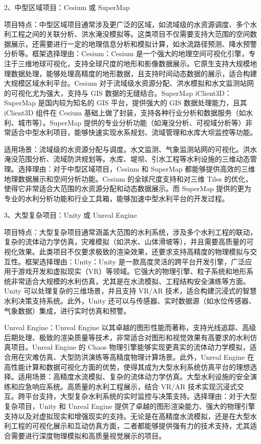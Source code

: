 2、中型区域项目：Cesium 或 SuperMap

项目特点：中型区域项目通常涉及更广泛的区域，如流域级的水资源调度、多个水利工程之间的关联分析、洪水淹没模拟等。这类项目不仅需要支持大范围的空间数据展示，还需要进行一定的地理信息分析和模拟计算，如水流路径预测、降水预警分析等。框架选择理由：Cesium：Cesium 是一个强大的地理空间可视化引擎，专注于三维地球可视化，支持全球尺度的地形和影像数据展示。它原生支持大规模地理数据处理，能够处理高精度的地形数据，且支持时间动态数据的展示，适合构建大规模区域水利平台。Cesium 对于流域级水资源分配、洪水模拟和水文监测站网的可视化尤为强大，支持与 GIS 数据的无缝结合。SuperMap iClient3D：SuperMap 是国内较为知名的 GIS 平台，提供强大的 GIS 数据处理能力，且其 iClient3D 组件在 Cesium 基础上做了封装，支持各种行业分析和数据服务（如水利、城市等）。SuperMap 提供的专业分析功能（如淹没分析、可视域分析等）非常适合中型水利项目，能够快速实现水系规划、流域管理和水库大坝监控等功能。

适用场景：流域级的水资源分配与调度。水文监测、气象监测站网的可视化。洪水淹没范围分析、流域防洪规划等。水库、堤坝、引水工程等水利设施的三维动态管理。选择理由：对于中型区域项目，Cesium 和 SuperMap 都能够提供高效的三维地理数据展示和空间分析功能。Cesium 的全球尺度支持和对三维 Tiles 的优化，使得它非常适合大范围的水资源分配和动态数据展示。而 SuperMap 提供的更为专业的水利分析功能和行业工具箱，能够加速中型水利平台的开发过程。

3、大型复杂项目：Unity 或 Unreal Engine

项目特点：大型复杂项目通常涵盖大范围的水利系统，涉及多个水利工程的联动，复杂的流体动力学仿真，灾难模拟（如洪水、山体滑坡等），并且需要高质量的可视化效果。此类项目不仅要求极致的渲染效果，还要求支持高精度的物理模拟与交互性。框架选择理由：Unity：Unity 是一款高度灵活的跨平台开发引擎，广泛应用于游戏开发和虚拟现实（VR）等领域。它强大的物理引擎、粒子系统和地形系统非常适合大规模的水利仿真，尤其是在水流模拟、工程结构安全演练等方面。Unity 可以处理复杂的三维场景，并且支持 VR/AR 技术，适合构建沉浸式的智慧水利决策支持系统。此外，Unity 还可以与传感器、实时数据源（如水位传感器、气象数据）集成，进行实时仿真和预警。

Unreal Engine：Unreal Engine 以其卓越的图形性能而著称，支持光线追踪、高级后期处理、极致的渲染质量等技术，非常适合对图形和视觉效果有高要求的水利仿真项目。Unreal Engine 的 Chaos 物理引擎能够实现更真实的流体动力学模拟，适合用在灾难仿真、大型防洪演练等高精度物理计算场景。此外，Unreal Engine 在高性能计算和数据可视化方面的优势，使得其成为大型水利系统仿真平台的理想选择。适用场景：高精度水流模拟、复杂的流体动力学仿真。大型水利设施的安全演练和应急响应系统。高质量的水利工程展示，结合 VR/AR 技术实现沉浸式交互。跨平台支持，大型复杂水利系统的实时监控与决策支持。选择理由：对于大型复杂项目，Unity 和 Unreal Engine 提供了卓越的图形渲染能力、强大的物理引擎支持以及对虚拟现实和增强现实的支持。无论是在高精度水流模拟，还是在大型水利工程的可视化展示和互动仿真方面，二者都能够提供强有力的技术支持，尤其适合需要进行深度物理模拟和高质量视觉展示的项目。

